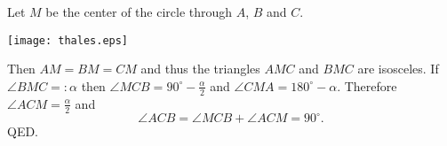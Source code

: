 \documentclass[12pt]{article}
\begin{document}
Let $M$ be the center of the circle through $A$, $B$ and $C$.

\begin{center}
\texttt{[image: thales.eps]}
\end{center}

Then $AM=BM=CM$ and thus the triangles $AMC$ and $BMC$ are isosceles. If $\angle BMC=:\alpha$ then $\angle MCB=90^\circ-\frac{\alpha}{2}$ and $\angle CMA=180^\circ-\alpha$. Therefore $\angle ACM=\frac{\alpha}{2}$ and
$$\angle ACB=\angle MCB+\angle ACM=90^\circ.$$
QED.
\end{document}
